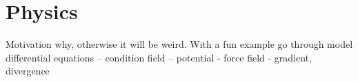 
\section{Physics}

Motivation why, otherwise it will be weird. With a fun example go through model differential equations -- condition field -- potential - force field - gradient, divergence